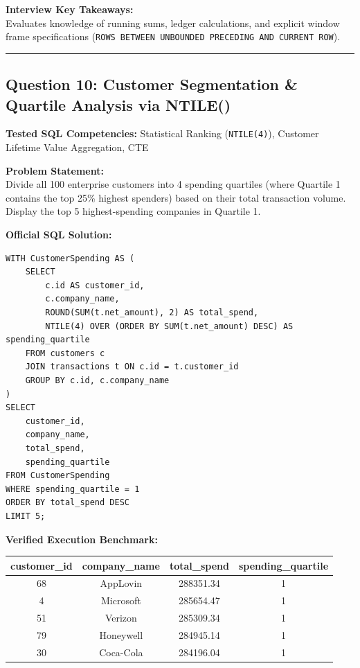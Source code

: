 \documentclass[11pt,a4paper]{article}
\begin{document}
\vspace{0.15cm}
\noindent\textbf{Interview Key Takeaways:} \\
Evaluates knowledge of running sums, ledger calculations, and explicit window frame specifications (\texttt{ROWS BETWEEN UNBOUNDED PRECEDING AND CURRENT ROW}).

\vspace{0.4cm}
\noindent\rule{\textwidth}{0.4pt}
\vspace{0.4cm}

\subsection*{Question 10: Customer Segmentation & Quartile Analysis via NTILE()}

\noindent\textbf{Tested SQL Competencies:} Statistical Ranking (\texttt{NTILE(4)}), Customer Lifetime Value Aggregation, CTE

\vspace{0.15cm}
\noindent\textbf{Problem Statement:} \\
Divide all 100 enterprise customers into 4 spending quartiles (where Quartile 1 contains the top 25\% highest spenders) based on their total transaction volume. Display the top 5 highest-spending companies in Quartile 1.

\vspace{0.25cm}
\noindent\textbf{Official SQL Solution:}
\begin{verbatim}
WITH CustomerSpending AS (
    SELECT 
        c.id AS customer_id,
        c.company_name,
        ROUND(SUM(t.net_amount), 2) AS total_spend,
        NTILE(4) OVER (ORDER BY SUM(t.net_amount) DESC) AS spending_quartile
    FROM customers c
    JOIN transactions t ON c.id = t.customer_id
    GROUP BY c.id, c.company_name
)
SELECT 
    customer_id,
    company_name,
    total_spend,
    spending_quartile
FROM CustomerSpending
WHERE spending_quartile = 1
ORDER BY total_spend DESC
LIMIT 5;
\end{verbatim}

\vspace{0.15cm}
\noindent\textbf{Verified Execution Benchmark:}
\begin{center}
\small
\begin{tabular}{cccc}
\toprule
\textbf{customer\_id} & \textbf{company\_name} & \textbf{total\_spend} & \textbf{spending\_quartile} \\
\midrule
68 & AppLovin & 288351.34 & 1 \\
4 & Microsoft & 285654.47 & 1 \\
51 & Verizon & 285309.34 & 1 \\
79 & Honeywell & 284945.14 & 1 \\
30 & Coca-Cola & 284196.04 & 1 \\
\bottomrule
\end{tabular}
\end{center}
\end{document}
